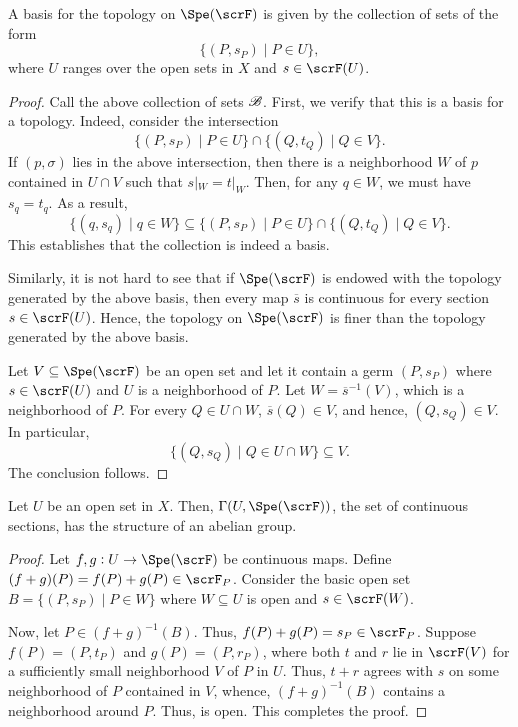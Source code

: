 \begin{proposition}
    A basis for the topology on $\Spe(\scrF)$ is given by the collection of sets of the form 
    \begin{equation*}
        \{(P, s_P)\mid P\in U\},
    \end{equation*}
    where $U$ ranges over the open sets in $X$ and $s\in\scrF(U)$.
\end{proposition}
\begin{proof}
    Call the above collection of sets $\mathscr B$. First, we verify that this is a basis for a topology. Indeed, consider the intersection 
    \begin{equation*}
        \{(P, s_P)\mid P\in U\}\cap\{(Q, t_Q)\mid Q\in V\}.
    \end{equation*}
    If $(p, \sigma)$ lies in the above intersection, then there is a neighborhood $W$ of $p$ contained in $U\cap V$ such that $s|_W = t|_W$. Then, for any $q\in W$, we must have $s_q = t_q$. As a result, 
    \begin{equation*}
        \{(q, s_q)\mid q\in W\}\subseteq \{(P, s_P)\mid P\in U\}\cap\{(Q, t_Q)\mid Q\in V\}.
    \end{equation*}
    This establishes that the collection is indeed a basis.

    Similarly, it is not hard to see that if $\Spe(\scrF)$ is endowed with the topology generated by the above basis, then every map $\overline s$ is continuous for every section $s\in\scrF(U)$. Hence, the topology on $\Spe(\scrF)$ is finer than the topology generated by the above basis.

    Let $V\subseteq\Spe(\scrF)$ be an open set and let it contain a germ $(P, s_P)$ where $s\in\scrF(U)$ and $U$ is a neighborhood of $P$. Let $W = \overline s^{-1}(V)$, which is a neighborhood of $P$. For every $Q\in U\cap W$, $\overline s(Q)\in V$, and hence, $(Q, s_Q)\in V$. In particular,
    \begin{equation*}
        \{(Q, s_Q)\mid Q\in U\cap W\}\subseteq V.
    \end{equation*}
    The conclusion follows.
\end{proof}

\begin{corollary}
    Let $U$ be an open set in $X$. Then, $\Gamma(U,\Spe(\scrF))$, the set of continuous sections, has the structure of an abelian group.
\end{corollary}
\begin{proof}
    Let $f,g: U\to\Spe(\scrF)$ be continuous maps. Define $(f + g)(P) = f(P) + g(P)\in\scrF_P$. Consider the basic open set $B = \{(P, s_P)\mid P\in W\}$ where $W\subseteq U$ is open and $s\in\scrF(W)$. 

    Now, let $P\in (f + g)^{-1}(B)$. Thus, $f(P) + g(P) = s_P\in\scrF_P$. Suppose $f(P) = (P, t_P)$ and $g(P) = (P, r_P)$, where both $t$ and $r$ lie in $\scrF(V)$ for a sufficiently small neighborhood $V$ of $P$ in $U$. Thus, $t + r$ agrees with $s$ on some neighborhood of $P$ contained in $V$, whence, $(f + g)^{-1}(B)$ contains a neighborhood around $P$. Thus, is open. This completes the proof.
\end{proof}

